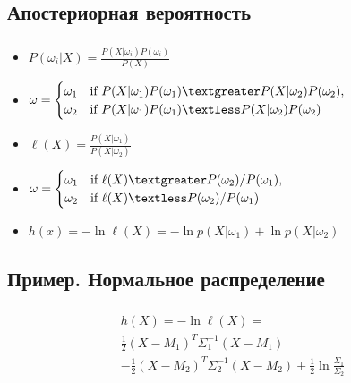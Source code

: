 \documentclass{beamer}
\begin{document}
\subsection{Апостериорная вероятность}

\begin{frame}
  \frametitle{\insertsection}
  \framesubtitle{\insertsubsection}

  \begin{itemize}
  \item $\displaystyle P(\omega_i | X) = \frac{P(X | \omega_i) P(\omega_i)}{P(X)} $ \pause
  \item $\displaystyle
    \omega =
    \begin{cases}
      \omega_1 & \text{if } P(X | \omega_1) P(\omega_1) \textgreater P(X | \omega_2) P(\omega_2),\\
      \omega_2 & \text{if } P(X | \omega_1) P(\omega_1) \textless P(X | \omega_2) P(\omega_2)
    \end{cases}$ \pause
  \item $\displaystyle \ell(X) = \frac{P(X | \omega_1)}{P(X | \omega_2)} $
    \pause
  \item $\displaystyle
    \omega =
    \begin{cases}
      \omega_1 & \text{if } \ell(X) \textgreater P(\omega_2) / P(\omega_1),\\
      \omega_2 & \text{if } \ell(X) \textless P(\omega_2) / P(\omega_1)
    \end{cases}$ \pause
  \item $\displaystyle h(x) = -\ln \ell(X) = -\ln p(X | \omega_1) + \ln p(X | \omega_2) $
  \end{itemize}
\end{frame}

\subsection{Пример. Нормальное распределение}

\begin{frame}
  \frametitle{\insertsection}
  \framesubtitle{\insertsubsection}

  \begin{multline*}
    h(X) = -\ln \ell(X) =\\
    \frac12 (X - M_1)^T \Sigma_1^{-1}(X - M_1)\\
    - \frac12 (X - M_2)^T \Sigma_2^{-1}(X - M_2) + \frac12 \ln \frac{\Sigma_1}{\Sigma_2}
  \end{multline*}

\end{frame}
\end{document}
